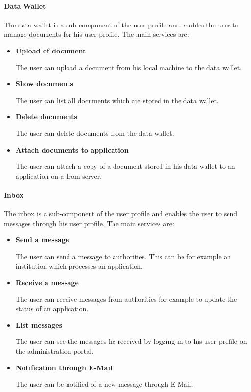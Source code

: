\paragraph{Data Wallet}
The data wallet is a sub-component of the user profile and enables the user to manage documents for his user profile. The main services are:

\begin{itemize}

    \item \textbf{Upload of document}
    
    The user can upload a document from his local machine to the data wallet.
    
    \item \textbf{Show documents}
    
    The user can list all documents which are stored in the data wallet.
    
    \item \textbf{Delete documents}
    
    The user can delete documents from the data wallet.
    
    \item \textbf{Attach documents to application}
    
    The user can attach a copy of a document stored in his data wallet to an application on a from server.

\end{itemize}

\paragraph{Inbox}
The inbox is a sub-component of the user profile and enables the user to send messages through his user profile. The main services are:
    
\begin{itemize}
    
    \item \textbf{Send a message}
    
    The user can send a message to authorities. This can be for example an institution which processes an application.
    
    \item \textbf{Receive a message}
    
    The user can receive messages from authorities for example to update the status of an application.
    
    \item \textbf{List messages}
    
    The user can see the messages he received by logging in to his user profile on the administration portal.
    
    \item \textbf{Notification through E-Mail}
    
    The user can be notified of a new message through E-Mail.

\end{itemize}

